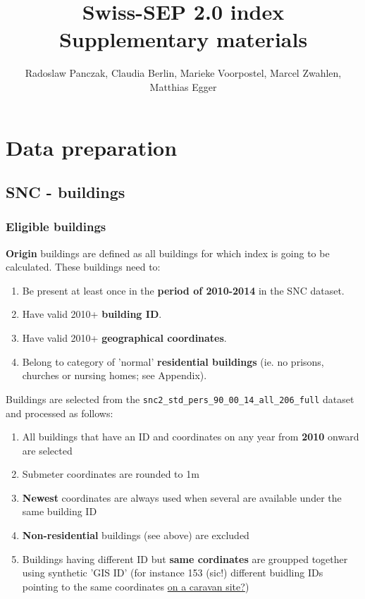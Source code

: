 \documentclass[a4paper, notitlepage, fleqn]{article} %
\title{\textbf{Swiss-SEP 2.0 index \endgraf 
Supplementary materials}}
\author{Radoslaw Panczak, Claudia Berlin, Marieke Voorpostel, Marcel Zwahlen, Matthias Egger}
\begin{document}
\maketitle
\tableofcontents
\newpage
\section{Data preparation}
\subsection{SNC - buildings}
\subsubsection{Eligible buildings}

\textbf{Origin} buildings are defined as all buildings for which index 
is going to be calculated. These buildings need to:

\begin{enumerate}

	\item Be present at least once in the \textbf{period of 2010-2014} in the SNC dataset.
	\item Have valid 2010+ \textbf{building ID}.
	\item Have valid 2010+ \textbf{geographical coordinates}.
	\item Belong to category of 'normal' \textbf{residential buildings} (ie. no prisons, churches or nursing homes; see Appendix).
	
\end{enumerate}
	
Buildings are selected from the \texttt{snc2\_std\_pers\_90\_00\_14\_all\_206\_full} dataset 
and processed as follows:
	
\begin{enumerate}

	\item All buildings that have an ID and coordinates on any year from \textbf{2010} onward are selected
		
	\item Submeter coordinates are rounded to 1m
		
	\item \textbf{Newest} coordinates are always used when several are available under the same building ID
	
	\item \textbf{Non-residential} buildings (see above) are excluded
	
	\item Buildings having different ID but \textbf{same cordinates} are groupped together using synthetic 'GIS ID'
		(for instance 153 (sic!) different buidling IDs pointing to the same coordinates \href{https://goo.gl/maps/eC8fDZtEboP2}{on a caravan site?})
		
\end{enumerate}
\end{document}
